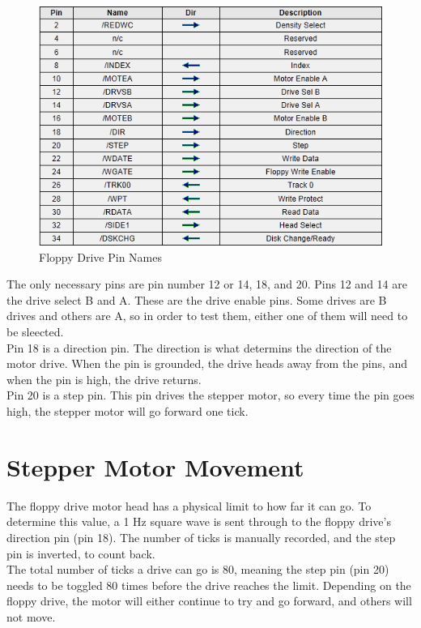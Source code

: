 \documentclass[11pt, a4paper]{report}
\begin{document}
\begin{figure}[H]
\hspace*{-2cm}    
    \centering
    \includegraphics[width=.75\textwidth]{pinNames.png}
    \caption{Floppy Drive Pin Names}
    \label{fig:pinNames}
\end{figure}

The only necessary pins are pin number 12 or 14, 18, and 20. Pins 12 and 14 are the drive select B and A. These are the drive enable pins. Some drives are B drives and others are A, so in order to test them, either one of them will need to be sleected.\\

Pin 18 is a direction pin. The direction is what determins the direction of the motor drive. When the pin is grounded, the drive heads away from the pins, and when the pin is high, the drive returns. \\

Pin 20 is a step pin. This pin drives the stepper motor, so every time the pin goes high, the stepper motor will go forward one tick. \\

\section{Stepper Motor Movement}

The floppy drive motor head has a physical limit to how far it can go. To determine this value, a 1 Hz square wave is sent through to the floppy drive's direction pin (pin 18). The number of ticks is manually recorded, and the step pin is inverted, to count back. \\

The total number of ticks a drive can go is 80, meaning the step pin (pin 20) needs to be toggled 80 times before the drive reaches the limit. Depending on the floppy drive, the motor will either continue to try and go forward, and others will not move. \\
\end{document}
